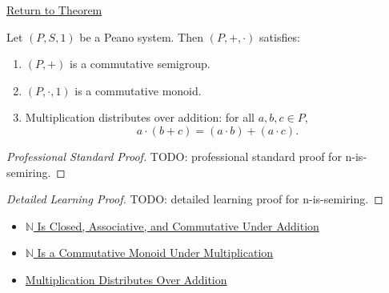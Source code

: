 \newpage
{}
\label{prf:n-is-semiring}

\begin{remark*}[Return]
\hyperref[thm:n-is-semiring]{Return to Theorem}
\end{remark*}

\begin{theorem*}[$N$ Is a Semiring]
Let $(P,S,1)$ be a Peano system. Then $(P,+,\cdot)$ satisfies:
\begin{enumerate}
  \item $(P,+)$ is a commutative semigroup.
  \item $(P,\cdot,1)$ is a commutative monoid.
  \item Multiplication distributes over addition: for all $a,b,c \in P$,
  \[
  a \cdot (b+c) = (a \cdot b) + (a \cdot c).
  \]
\end{enumerate}
\end{theorem*}

\begin{proof}[Professional Standard Proof]
\LRAProofBodyStart
TODO: professional standard proof for n-is-semiring.
\end{proof}

\begin{proof}[Detailed Learning Proof]
\LRAProofBodyStart
TODO: detailed learning proof for n-is-semiring.
\end{proof}

\begin{remark*}
\end{remark*}

\begin{dependencies}
\begin{itemize}
  \item \hyperref[thm:n-additive-structure]{$\mathbb{N}$ Is Closed, Associative, and Commutative Under Addition}
  \item \hyperref[thm:n-multiplicative-monoid]{$\mathbb{N}$ Is a Commutative Monoid Under Multiplication}
  \item \hyperref[thm:multiplication-distributes-over-addition]{Multiplication Distributes Over Addition}
\end{itemize}
\end{dependencies}

\clearpage
